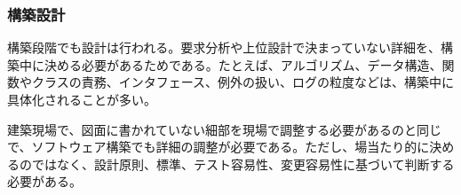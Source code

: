 \subsubsection{構築設計}

構築段階でも設計は行われる。要求分析や上位設計で決まっていない詳細を、構築中に決める必要があるためである。たとえば、アルゴリズム、データ構造、関数やクラスの責務、インタフェース、例外の扱い、ログの粒度などは、構築中に具体化されることが多い。

建築現場で、図面に書かれていない細部を現場で調整する必要があるのと同じで、ソフトウェア構築でも詳細の調整が必要である。ただし、場当たり的に決めるのではなく、設計原則、標準、テスト容易性、変更容易性に基づいて判断する必要がある。
